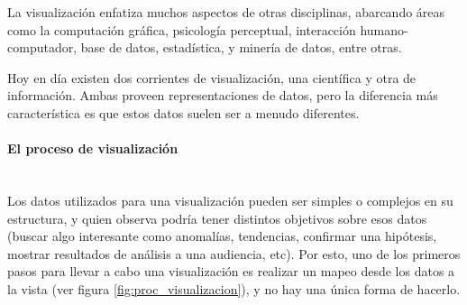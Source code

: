 \documentclass[12pt]{article}
\begin{document}


La visualización enfatiza muchos aspectos de otras disciplinas, abarcando áreas como la computación gráfica, psicología perceptual, interacción humano-computador, base de datos, estadística, y minería de datos, entre otras. 
	
Hoy en día existen dos corrientes de visualización, una científica y otra de información. Ambas proveen representaciones de datos, pero la diferencia más característica es que estos datos suelen ser a menudo diferentes. 

\paragraph{El proceso de visualización} \hfill \\

Los datos utilizados para una visualización pueden ser simples o complejos en su estructura, y quien observa podría tener distintos objetivos sobre esos datos (buscar algo interesante como anomalías, tendencias, confirmar una hipótesis, mostrar resultados de análisis a una audiencia, etc). Por esto, uno de los primeros pasos para llevar a cabo una visualización es realizar un mapeo desde los datos a la vista (ver figura \ref{fig:proc_visualizacion}), y no hay una única forma de hacerlo. 

\end{document}
